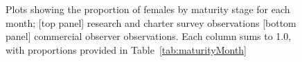 \begin{figure}[htp]
\captionsetup[subfigure]{labelformat=empty}
\begin{center}
\newline
{}
\end{center}
\caption{Plots showing the proportion of \fishname females by maturity stage for each month; [top panel] research and charter survey observations [bottom panel] commercial observer observations. Each column sums to 1.0, with proportions provided in Table~\ref{tab:maturityMonth}}
\label{fig:maturity}
\end{figure}

